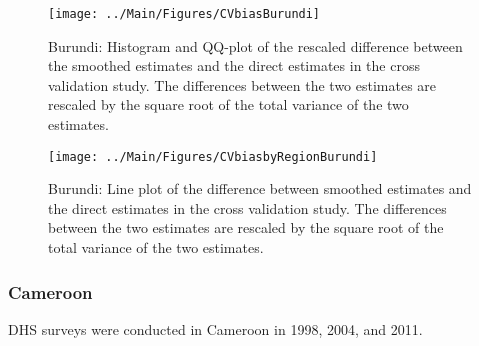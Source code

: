 \documentclass[12pt]{article}\usepackage[]{graphicx}\usepackage[]{color}
\newenvironment{knitrout}{}{} %
\begin{document}
\begin{knitrout}
\color{fgcolor}\begin{figure}[bht]

{\centering \texttt{[image: ../Main/Figures/CVbiasBurundi]} 

}

\caption[Burundi]{Burundi: Histogram and QQ-plot of the rescaled difference between the smoothed estimates and the direct estimates in the cross validation study. The differences between the two estimates are rescaled by the square root of the total variance of the two estimates.}\label{fig:unnamed-chunk-39}
\end{figure}


\end{knitrout}

\begin{knitrout}
\color{fgcolor}\begin{figure}[bht]

{\centering \texttt{[image: ../Main/Figures/CVbiasbyRegionBurundi]} 

}

\caption[Burundi]{Burundi: Line plot of the difference between smoothed estimates and the direct estimates in the cross validation study. The differences between the two estimates are rescaled by the square root of the total variance of the two estimates.}\label{fig:unnamed-chunk-40}
\end{figure}


\end{knitrout}

\clearpage
\subsubsection{Cameroon}





DHS surveys were conducted in Cameroon in 1998, 2004, and 2011.
\end{document}
